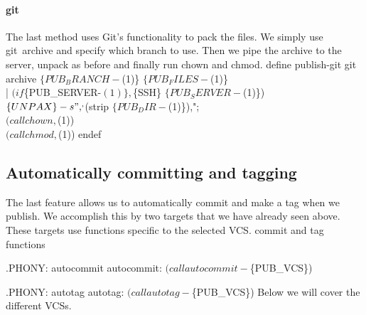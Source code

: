 \paragraph{git}

The last method uses Git's functionality to pack the files.
We simply use {\Tt{}git\ archive\nwendquote} and specify which branch to use.
Then we pipe the archive to the server, unpack as before and finally run 
{\Tt{}chown\nwendquote} and {\Tt{}chmod\nwendquote}.
\nwenddocs{}\endmoddef\nwstartdeflinemarkup{}\nwenddeflinemarkup
define publish-git
git archive $\{PUB_BRANCH-$(1)\} $\{PUB_FILES-$(1)\} \\
  | $(if $\{PUB_SERVER-$(1)\},$\{SSH\} $\{PUB_SERVER-$(1)\}) \\
    $\{UNPAX\} -s ",^,$(strip $\{PUB_DIR-$(1)\}),"; \\
$(call chown,$(1)) \\
$(call chmod,$(1))
endef
\nwendcode{}\nwdocspar

\subsection{Automatically committing and tagging}

The last feature allows us to automatically commit and make a tag when we 
publish.
We accomplish this by two targets that we have already seen above.
These targets use functions specific to the selected \ac{VCS}.
\nwenddocs{}\endmoddef\nwstartdeflinemarkup{}\nwenddeflinemarkup
\LA{}commit and tag functions~{\nwtagstyle{}}\RA{}

.PHONY: autocommit
autocommit:
  $(call autocommit-$\{PUB_VCS\})

.PHONY: autotag
autotag:
  $(call autotag-$\{PUB_VCS\})
\nwendcode{}Below we will cover the different \acp{VCS}.

